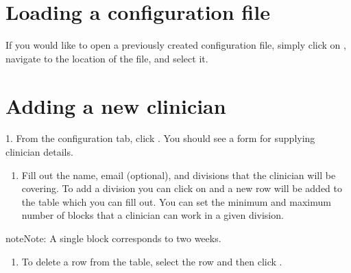 \documentclass[letterpaper,10pt,english]{sphinxmanual}
\begin{document}
\section{Loading a configuration file}
\label{\detokenize{manual:loading-a-configuration-file}}
If you would like to open a previously created configuration file, simply
click on , navigate to the location of the file,
and select it.

\begin{figure}[H]
\centering

\end{figure}


\section{Adding a new clinician}
\label{\detokenize{manual:adding-a-new-clinician}}\label{\detokenize{manual:id2}}
1. From the configuration tab, click . You should see a
form for supplying clinician details.

\begin{figure}[H]
\centering

\end{figure}
\begin{enumerate}
%
\setcounter{enumi}{1}
\item {} 
Fill out the name, email (optional), and divisions that the clinician
will be covering. To add a division you can click on  and a new row
will be added to the table which you can fill out. You can set the minimum
and maximum number of blocks that a clinician can work in a given division.

\end{enumerate}

\begin{sphinxadmonition}{note}{Note:}
A single block corresponds to two weeks.
\end{sphinxadmonition}

\begin{figure}[H]
\centering

\end{figure}
\begin{enumerate}
%
\setcounter{enumi}{2}
\item {} 
To delete a row from the table, select the row and then click .

\end{enumerate}
\end{document}
